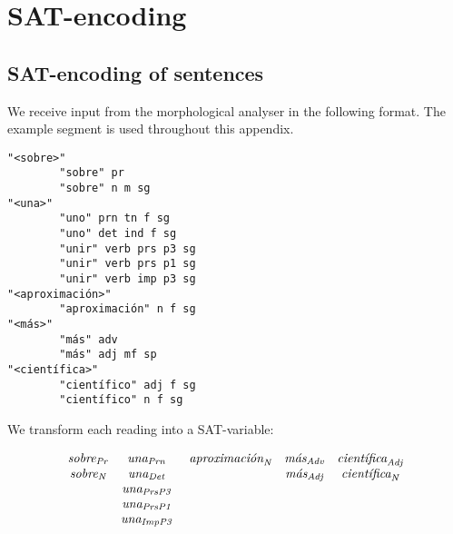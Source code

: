 \def\sobre{\text{\em sobre}}
\def\una{\text{\em una}}
\def\mas{\text{\em m\'{a}s}}
\def\cientifica{\text{\em cient\'{\i}fica}}
\def\aproximacion{\text{ \em aproximaci\'{o}n}}


\def\vPrsPThree{\text{\em PrsP3}}
\def\vPrsPOne{\text{\em PrsP1}}
\def\vImpPThree{\text{\em ImpP3}}
\def\adj{{\text{\em Adj}}}
\def\adv{{\text{\em Adv}}}
\def\n{\text{\em N}}
\def\pr{{\text{\em Pr}}}
\def\prn{{\text{\em Prn}}}
\def\det{{\text{\em Det}}}
\def\notDet{{\neg \text{\em Det}}}
\def\any{{\text{Any}}}


\def\sobrePr{\sobre_\pr}
\def\sobreN{\sobre_\n}

\def\unaNotDet{\una_\notDet}
\def\unaAny{\una_\any}
\def\unaPrn{\una_\prn}
\def\unaDet{\una_\det}
\def\unaPrsPThree{\una_\vPrsPThree}
\def\unaPrsPOne{\una_\vPrsPOne}
\def\unaImp{\una_\vImpPThree}
\def\aproximacionN{\aproximacion_\n}
\def\masAdv{\mas_\adv}
\def\masAdj{\mas_\adj}
\def\cientificaAdj{\cientifica_\adj}
\def\cientificaN{\cientifica_\n}

\def\cgrule#1{\noindent {\sc \bf #1 }}

\appendix
\chapter{SAT-encoding}

\section{SAT-encoding of sentences}

We receive input from the morphological analyser in the following format.
The example segment is used throughout this appendix.

\begin{verbatim}
"<sobre>"
        "sobre" pr
        "sobre" n m sg
"<una>"
        "uno" prn tn f sg
        "uno" det ind f sg
        "unir" verb prs p3 sg
        "unir" verb prs p1 sg
        "unir" verb imp p3 sg
"<aproximación>"
        "aproximación" n f sg
"<más>"
        "más" adv
        "más" adj mf sp
"<científica>"
        "científico" adj f sg
        "científico" n f sg
\end{verbatim}

We transform each reading into a SAT-variable:


\begin{equation}
\begin{array}{c c c c c}
\sobrePr & \unaPrn & \aproximacionN & \masAdv & \cientificaAdj \\
\sobreN  & \unaDet &                & \masAdj & \cientificaN \\
         & \unaPrsPThree \\
         & \unaPrsPOne \\
         & \unaImp \\
\end{array}
\end{equation}

